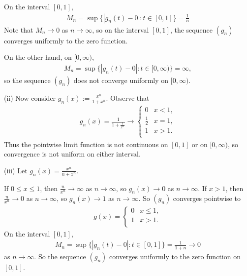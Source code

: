 \documentclass[letterpaper,10pt,english]{jupyterBook}
\begin{document}
On the interval \([0,1]\),
\begin{equation*}
\begin{split}
M_n = \sup \{ |g_n(t) -0 | : t\in [0,1] \}  = \frac{1}{n}
\end{split}
\end{equation*}
\sphinxAtStartPar
Note that \(M_n\rightarrow 0\) as \(n\rightarrow \infty\), so on the interval \([0,1]\), the sequence \((g_n)\) converges uniformly to the zero function.

On the other hand,  on \([0,\infty )\),
\begin{equation*}
\begin{split}
M_n = \sup \{ |g_n(t) -0 | : t\in [0,\infty ) \}  = \infty,
\end{split}
\end{equation*}
\sphinxAtStartPar
so the sequence \((g_n)\) does not converge uniformly on \([0,\infty )\).

\sphinxAtStartPar
(ii) Now consider \(\displaystyle g_n(x) := \frac{x^n}{1+x^n}\). Observe that
\begin{equation*}
\begin{split}
g_n (x) = \frac{1}{1+\frac{1}{x^n}} \rightarrow \left\{ \begin{array}{ll}
0 & x<1, \\
\frac{1}{2} & x=1, \\
1 & x>1. \\
\end{array} \right.
\end{split}
\end{equation*}
\sphinxAtStartPar
Thus the pointwise limit function is not continuous on \([0,1]\) or on \([0,\infty )\), so convergence is not uniform on either interval.

\sphinxAtStartPar
(iii) Let \(\displaystyle g_n(x) =  \frac{x^n}{n+x^n}\).

\sphinxAtStartPar
If \(0\leq x\leq 1\), then \(\frac{n}{x^n} \rightarrow \infty\) as \(n\rightarrow \infty\), so \(g_n(x)\rightarrow 0\) as \(n\rightarrow \infty\). If \(x>1\), then \(\frac{n}{x^n} \rightarrow 0\) as \(n\rightarrow \infty\), so \(g_n(x)\rightarrow 1\) as \(n\rightarrow \infty\). So \((g_n)\) converges pointwise to
\begin{equation*}
\begin{split}
g (x) =  \left\{ \begin{array}{ll}
0 & x\leq 1, \\
1 & x>1. \\
\end{array} \right.
\end{split}
\end{equation*}
\sphinxAtStartPar
On the interval \([0,1]\),
\begin{equation*}
\begin{split}
M_n = \sup \{ |g_n(t) -0 | : t\in [0,1] \}  = \frac{1}{1+n} \rightarrow 0
\end{split}
\end{equation*}
\sphinxAtStartPar
as \(n\rightarrow \infty\). So the sequence \((g_n)\) converges uniformly to the zero function on \([0,1]\).
\end{document}
